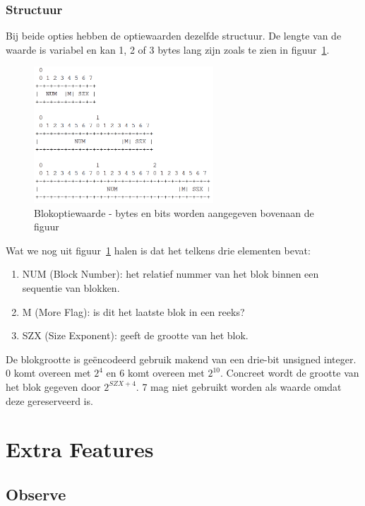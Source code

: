 \subsubsection{Structuur}
Bij beide opties hebben de optiewaarden dezelfde structuur. De lengte van de waarde is variabel en kan 1, 2 of 3 bytes lang zijn zoals te zien in figuur~\ref{fig:blockOption}.
\begin{figure}[h]
\centering
\includegraphics[width=0.6\textwidth]{fig/blockOption}
\caption{Blokoptiewaarde - bytes en bits worden aangegeven bovenaan de figuur}
\label{fig:blockOption}
\end{figure}

\noindent
Wat we nog uit figuur~\ref{fig:blockOption} halen is dat het telkens drie elementen bevat:
\begin{enumerate}
\item NUM (Block Number): het relatief nummer van het blok binnen een sequentie van blokken.
\item M (More Flag): is dit het laatste blok in een reeks?
\item SZX (Size Exponent): geeft de grootte van het blok.
\end{enumerate}

\noindent
De blokgrootte is ge\"{e}ncodeerd gebruik makend van een drie-bit unsigned integer. 0 komt overeen met $ 2^{4} $ en 6 komt overeen met  $ 2^{10} $. Concreet wordt de grootte van het blok gegeven door  $ 2^{ SZX + 4} $. 7 mag niet gebruikt worden als waarde omdat deze gereserveerd is.

\section{Extra Features}

\subsection{Observe} \label{observe}

